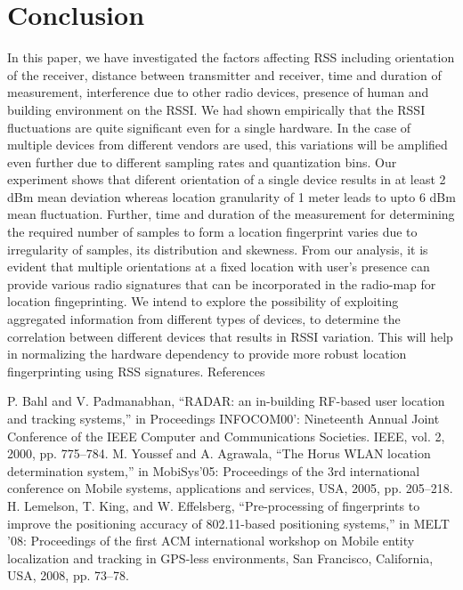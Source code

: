 \documentclass[conference]{IEEEtran}
\begin{document}
	\section{Conclusion}
	In this paper, we have investigated the factors affecting
	RSS including orientation of the receiver, distance between
	transmitter and receiver, time and duration of measurement,
	interference due to other radio devices, presence of human and
	building environment on the RSSI. We had shown empirically
	that the RSSI fluctuations are quite significant even for a
	single hardware. In the case of multiple devices from different
	vendors are used, this variations will be amplified even further
	due to different sampling rates and quantization bins. Our
	experiment shows that diferent orientation of a single device
	results in at least 2 dBm mean deviation whereas location
	granularity of 1 meter leads to upto 6 dBm mean fluctuation.
	Further, time and duration of the measurement for determining
	the required number of samples to form a location fingerprint
	varies due to irregularity of samples, its distribution and skewness. From our analysis, it is evident that multiple orientations
	at a fixed location with user’s presence can provide various
	radio signatures that can be incorporated in the radio-map
	for location fingeprinting. We intend to explore the possibility
	of exploiting aggregated information from different types of
	devices, to determine the correlation between different devices
	that results in RSSI variation. This will help in normalizing
	the hardware dependency to provide more robust location
	fingerprinting using RSS signatures.
	References
	
	
	
	\begin{thebibliography}{00}
		 P. Bahl and V. Padmanabhan, “RADAR: an in-building RF-based user
		location and tracking systems,” in Proceedings INFOCOM00’: Nineteenth
		Annual Joint Conference of the IEEE Computer and Communications
		Societies. IEEE, vol. 2, 2000, pp. 775–784.
		 M. Youssef and A. Agrawala, “The Horus WLAN location determination
		system,” in MobiSys’05: Proceedings of the 3rd international conference
		on Mobile systems, applications and services, USA, 2005, pp. 205–218.
		 H. Lemelson, T. King, and W. Effelsberg, “Pre-processing of fingerprints
		to improve the positioning accuracy of 802.11-based positioning systems,”
		in MELT ’08: Proceedings of the first ACM international workshop on
		Mobile entity localization and tracking in GPS-less environments, San
		Francisco, California, USA, 2008, pp. 73–78.
		
	\end{thebibliography}
	
	
\end{document}
